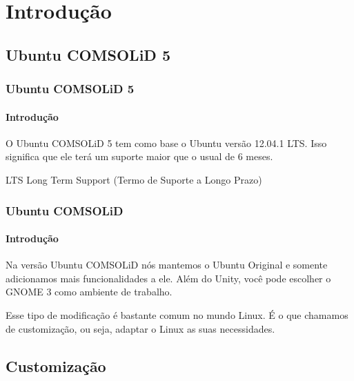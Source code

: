 %
%
\section{Introdução}

\begin{frame}


\end{frame}

\subsection{Ubuntu COMSOLiD 5}

\begin{frame}


\end{frame}

\begin{frame}\frametitle{Ubuntu COMSOLiD 5}\framesubtitle{Introdução}

O Ubuntu COMSOLiD 5 tem como base o Ubuntu versão 12.04.1 LTS.
Isso significa que ele terá um suporte maior que o usual de 6 meses.

\bigskip

\begin{exampleblock}{LTS}
Long Term Support (Termo de Suporte a Longo Prazo)
\end{exampleblock}

\end{frame}

\begin{frame}\frametitle{Ubuntu COMSOLiD}\framesubtitle{Introdução}
Na versão Ubuntu COMSOLiD nós mantemos o Ubuntu Original e somente adicionamos
mais funcionalidades a ele. Além do Unity, você pode escolher o GNOME 3 como
ambiente de trabalho.

\medskip

Esse tipo de modificação é bastante comum no mundo Linux. É o que chamamos
de customização, ou seja, adaptar o Linux as suas necessidades.

\end{frame}

\subsection{Customização}

\begin{frame}


\end{frame}

